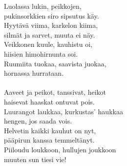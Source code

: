 
            Luolassa lukin, peikkojen, \\
            pukinsorkkien siro sipsutus käy. \\
            Hyytävä viima, karkelon kiima, \\
            silmät ja sarvet, muuta ei näy. \\
            Veikkonen kuule, kauhistu oi, \\
            hiisien himohirnunta soi. \\
            Ruumiita tuokaa, saavista juokaa, \\
            hornassa hurrataan. \\
\hspace{10mm} \\
            Aaveet ja peikot, tanssivat, heikot \\
            haisevat haaskat ontuvat pois. \\
            Luurangot laukkaa, kurkustas’ haukkaa \\
            hengen, jos saada vois. \\
            Helvetin kaikki kauhut on nyt, \\
            pääpirun kanssa temmeltänyt. \\
            Piiloudu loukkoon, hullujen joukkoon \\
            muuten sun tiesi vie! \\
